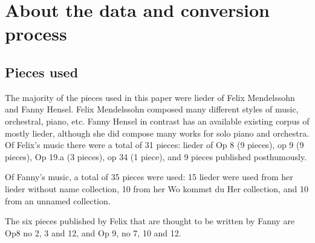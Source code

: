 \documentclass[12pt,twoside]{reedthesis}
\theoremstyle{definition}
\theoremstyle{definition}
\theoremstyle{definition}
\theoremstyle{remark}
\begin{document}
\chapter{About the data and conversion
process}\label{about-the-data-and-conversion-process}

\section{Pieces used}\label{pieces-used}

The majority of the pieces used in this paper were lieder of Felix
Mendelssohn and Fanny Hensel. Felix Mendelssohn composed many different
styles of music, orchestral, piano, etc. Fanny Hensel in contrast has an
available existing corpus of mostly lieder, although she did compose
many works for solo piano and orchestra. Of Felix's music there were a
total of 31 pieces: lieder of Op 8 (9 pieces), op 9 (9 pieces), Op 19.a
(3 pieces), op 34 (1 piece), and 9 pieces published posthumously.

Of Fanny's music, a total of 35 pieces were used: 15 lieder were used
from her lieder without name collection, 10 from her Wo kommst du Her
collection, and 10 from an unnamed collection.

The six pieces published by Felix that are thought to be written by
Fanny are Op8 no 2, 3 and 12, and Op 9, no 7, 10 and 12.
\end{document}
